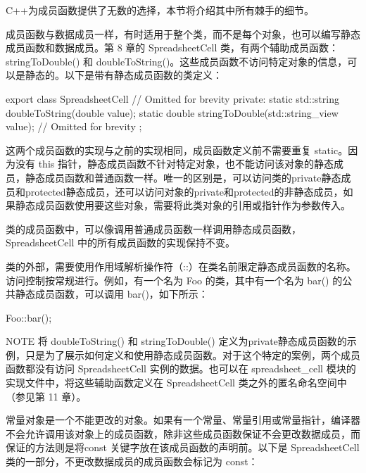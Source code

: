
C++为成员函数提供了无数的选择，本节将介绍其中所有棘手的细节。


成员函数与数据成员一样，有时适用于整个类，而不是每个对象，也可以编写静态成员函数和数据成员。第 8 章的 SpreadsheetCell 类，有两个辅助成员函数：stringToDouble() 和 doubleToString()。这些成员函数不访问特定对象的信息，可以是静态的。以下是带有静态成员函数的类定义：

\begin{cpp}
export class SpreadsheetCell
{
    // Omitted for brevity
    private:
        static std::string doubleToString(double value);
        static double stringToDouble(std::string_view value);
        // Omitted for brevity
};
\end{cpp}

这两个成员函数的实现与之前的实现相同，成员函数定义前不需要重复 static。因为没有 this 指针，静态成员函数不针对特定对象，也不能访问该对象的静态成员，静态成员函数和普通函数一样。唯一的区别是，可以访问类的private静态成员和protected静态成员，还可以访问对象的private和protected的非静态成员，如果静态成员函数使用要这些对象，需要将此类对象的引用或指针作为参数传入。

类的成员函数中，可以像调用普通成员函数一样调用静态成员函数，SpreadsheetCell 中的所有成员函数的实现保持不变。

类的外部，需要使用作用域解析操作符（::）在类名前限定静态成员函数的名称。访问控制按常规进行。例如，有一个名为 Foo 的类，其中有一个名为 bar() 的公共静态成员函数，可以调用 bar()，如下所示：

\begin{cpp}
Foo::bar();
\end{cpp}

\begin{myNotic}{NOTE}
将 doubleToString() 和 stringToDouble() 定义为private静态成员函数的示例，只是为了展示如何定义和使用静态成员函数。对于这个特定的案例，两个成员函数都没有访问 SpreadsheetCell 实例的数据。也可以在 spreadsheet\_cell 模块的实现文件中，将这些辅助函数定义在 SpreadsheetCell 类之外的匿名命名空间中（参见第 11 章）。
\end{myNotic}


常量对象是一个不能更改的对象。如果有一个常量、常量引用或常量指针，编译器不会允许调用该对象上的成员函数，除非这些成员函数保证不会更改数据成员，而保证的方法则是将const 关键字放在该成员函数的声明前。以下是 SpreadsheetCell 类的一部分，不更改数据成员的成员函数会标记为 const：

